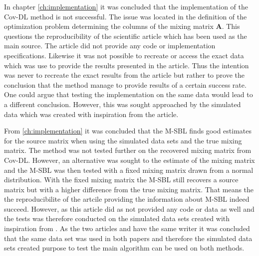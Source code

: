 In chapter \ref{ch:implementation} it was concluded that the implementation of the Cov-DL method is not successful.
The issue was located in the definition of the optimization problem determining the columns of the mixing matrix $\mathbf{A}$.  
This questions the reproducibility of the scientific article \cite{Cov} which has been used as the main source. 
The article \cite{cov} did not provide any code or implementation specifications. 
Likewise it was not possible to recreate or access the exact data which was use to provide the results presented in the article. 
Thus the intention was never to recreate the exact results from the article but rather to prove the conclusion that the method manage to provide results of a certain success rate.    
One could argue that testing the implementation on the same data would lead to a different conclusion. 
However, this was sought approached by the simulated data which was created with inspiration from the article.

From \ref{ch:implementation} it was concluded that the M-SBL finds good estimates for the source matrix when using the simulated data sets and the true mixing matrix. 
The method was not tested further on the recovered mixing matrix from Cov-DL.
However, an alternative was sought to the estimate of the mixing matrix and the M-SBL was then tested with a fixed mixing matrix drawn from a normal distribution. 
With the fixed mixing matrix the M-SBL still recovers a source matrix but with a higher difference from the true mixing matrix.
That means the the reproducibilite of the artcile \cite{M-SBL} providing the information about M-SBL indeed succeed.
However, as this article did as \cite{Cov} not provided any code or data as well and the tests was therefore conducted on the simulated data sets created with inspiration from \cite{Cov}.
As the two articles \cite{M-SBL} and \cite{Cov} have the same writer it was concluded that the same data set was used in both papers and therefore the simulated data sets created purpose to test the main algorithm can be used on both methods.


